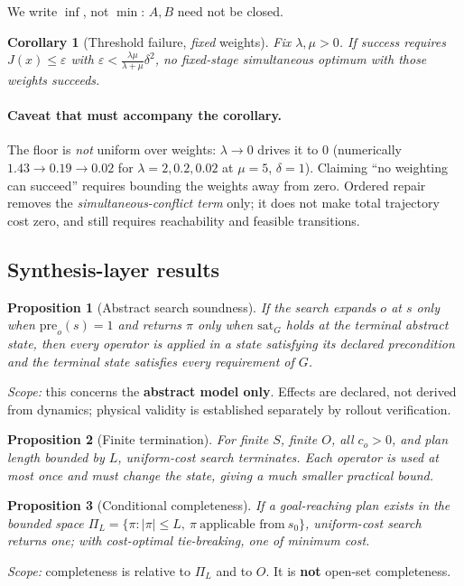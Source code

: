 \documentclass[11pt]{article}
\newtheorem{proposition}{Proposition}
\newtheorem{corollary}{Corollary}
\begin{document}
We write $\inf$, not $\min$: $A,B$ need not be closed.

\begin{corollary}[Threshold failure, \emph{fixed} weights]
Fix $\lambda,\mu>0$. If success requires $J(x)\le\varepsilon$ with
$\varepsilon<\frac{\lambda\mu}{\lambda+\mu}\delta^2$, no fixed-stage
simultaneous optimum \emph{with those weights} succeeds.
\end{corollary}

\paragraph{Caveat that must accompany the corollary.} The floor is \emph{not}
uniform over weights: $\lambda\to0$ drives it to $0$ (numerically
$1.43\to0.19\to0.02$ for $\lambda=2,0.2,0.02$ at $\mu=5$, $\delta=1$). Claiming
``no weighting can succeed'' requires bounding the weights away from zero.
Ordered repair removes the \emph{simultaneous-conflict term} only; it does not
make total trajectory cost zero, and still requires reachability and feasible
transitions.

\subsection{Synthesis-layer results}

\begin{proposition}[Abstract search soundness]
If the search expands $o$ at $s$ only when $\mathrm{pre}_o(s)=1$ and returns
$\pi$ only when $\mathrm{sat}_G$ holds at the terminal abstract state, then every
operator is applied in a state satisfying its declared precondition and the
terminal state satisfies every requirement of $G$.
\end{proposition}
\emph{Scope:} this concerns the \textbf{abstract model only}. Effects are
declared, not derived from dynamics; physical validity is established separately
by rollout verification.

\begin{proposition}[Finite termination]\label{prop:term}
For finite $S$, finite $O$, all $c_o>0$, and plan length bounded by $L$,
uniform-cost search terminates. Each operator is used at most once and must
change the state, giving a much smaller practical bound.
\end{proposition}

\begin{proposition}[Conditional completeness]
If a goal-reaching plan exists in the bounded space
$\Pi_L=\{\pi:|\pi|\le L,\ \pi\ \text{applicable from}\ s_0\}$, uniform-cost
search returns one; with cost-optimal tie-breaking, one of minimum cost.
\end{proposition}
\emph{Scope:} completeness is relative to $\Pi_L$ and to $O$. It is
\textbf{not} open-set completeness.
\end{document}
